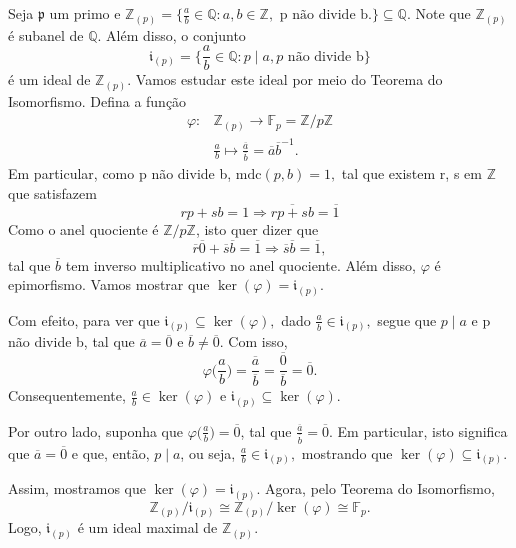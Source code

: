 \documentclass[AlgebraII/algebraII_notes.tex]{subfiles}
\begin{document}
\begin{example}
	Seja \(\mathfrak{p}\) um primo e \(\mathbb{Z}_{(p)} = \biggl\{\frac{a}{b}\in \mathbb{Q}:a, b\in \mathbb{Z}, \text{ p não divide b.}\biggr\} \subseteq \mathbb{Q}\).
	Note que \(\mathbb{Z}_{(p)}\) é subanel de \(\mathbb{Q}.\) Além disso, o conjunto
	\[
		\mathfrak{i}_{(p)}=\biggl\{\frac{a}{b}\in \mathbb{Q}: p\mid a, p \text{ não divide b}\biggr\}
	\]
	é um ideal de \(\mathbb{Z}_{(p)}\). Vamos estudar este ideal por meio do Teorema do Isomorfismo. Defina a função
	\begin{align*}
		\varphi : & \mathbb{Z}_{(p)}\rightarrow \mathbb{F}_{p} = \mathbb{Z}/p \mathbb{Z}                  \\
		          & \frac{a}{b}\mapsto \frac{\overline{a}}{\overline{b}} = \overline{a}\overline{b}^{-1}.
	\end{align*}
	Em particular, como p não divide b, \(\mathrm{mdc}(p, b) = 1,\) tal que existem r, s em \(\mathbb{Z}\) que satisfazem
	\[
		rp + sb = 1 \Rightarrow \overline{rp + sb} = \overline{1}
	\]
	Como o anel quociente é \(\mathbb{Z}/p \mathbb{Z}\), isto quer dizer que
	\[
		\overline{r}\overline{0} + \overline{s}\overline{b} = \overline{1} \Rightarrow \overline{s}\overline{b} = \overline{1},
	\]
	tal que \(\overline{b}\) tem inverso multiplicativo no anel quociente. Além disso, \(\varphi \) é epimorfismo. Vamos mostrar que
	\(\ker{(\varphi )} = \mathfrak{i}_{(p)}.\)

	Com efeito, para ver que \(\mathfrak{i}_{(p)}\subseteq \ker{(\varphi )},\) dado \(\frac{a}{b}\in \mathfrak{i}_{(p)},\) segue que \(p\mid a\) e p não divide b, tal que
	\(\overline{a} = \overline{0}\) e \(\overline{b}\neq \overline{0}.\) Com isso,
	\[
		\varphi \biggl(\frac{a}{b}\biggr) = \frac{\overline{a}}{\overline{b}} = \frac{\overline{0}}{\overline{b}} = \overline{0}.
	\]
	Consequentemente, \(\frac{a}{b}\in \ker{(\varphi )}\) e \(\mathfrak{i}_{(p)}\subseteq \ker{(\varphi )}\).

	Por outro lado, suponha que \(\varphi \biggl(\frac{a}{b}\biggr)=\overline{0}\), tal que \(\frac{\overline{a}}{\overline{b}} = \overline{0}\). Em particular, isto significa que
	\(\overline{a} = \overline{0}\) e que, então, \(p\mid a\), ou seja, \(\frac{a}{b}\in \mathfrak{i}_{(p)},\) mostrando que \(\ker{(\varphi )}\subseteq \mathfrak{i}_(p)\).

	Assim, mostramos que \(\ker{(\varphi )} = \mathfrak{i}_{(p)}.\) Agora, pelo Teorema do Isomorfismo,
	\[
		\mathbb{Z}_{(p)}/\mathfrak{i}_{(p)} \cong{\mathbb{Z}_{(p)}/\ker{(\varphi )}} \cong{\mathbb{F}_{p}}.
	\]
	Logo, \(\mathfrak{i}_{(p)}\) é um ideal maximal de \(\mathbb{Z}_{(p)}\).


\end{example}
\end{document}
